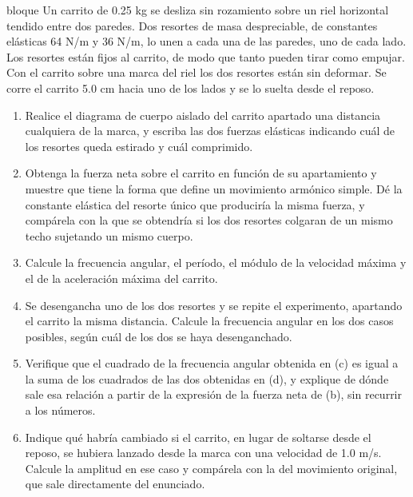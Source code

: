 \documentclass[11pt,openany]{book}
\begin{document}
\begin{ejercicio}{bloque}
Un carrito de 0.25 kg se desliza sin rozamiento sobre un riel horizontal tendido entre dos paredes. Dos resortes de masa despreciable, de constantes elásticas 64 N/m y 36 N/m, lo unen a cada una de las paredes, uno de cada lado. Los resortes están fijos al carrito, de modo que tanto pueden tirar como empujar. Con el carrito sobre una marca del riel los dos resortes están sin deformar. Se corre el carrito 5.0 cm hacia uno de los lados y se lo suelta desde el reposo.
\begin{enumerate}[label=(\alph*), leftmargin=1.7em, itemsep=1pt, topsep=3pt]
  \item Realice el diagrama de cuerpo aislado del carrito apartado una distancia cualquiera de la marca, y escriba las dos fuerzas elásticas indicando cuál de los resortes queda estirado y cuál comprimido.
  \item Obtenga la fuerza neta sobre el carrito en función de su apartamiento y muestre que tiene la forma que define un movimiento armónico simple. Dé la constante elástica del resorte único que produciría la misma fuerza, y compárela con la que se obtendría si los dos resortes colgaran de un mismo techo sujetando un mismo cuerpo.
  \item Calcule la frecuencia angular, el período, el módulo de la velocidad máxima y el de la aceleración máxima del carrito.
  \item Se desengancha uno de los dos resortes y se repite el experimento, apartando el carrito la misma distancia. Calcule la frecuencia angular en los dos casos posibles, según cuál de los dos se haya desenganchado.
  \item Verifique que el cuadrado de la frecuencia angular obtenida en (c) es igual a la suma de los cuadrados de las dos obtenidas en (d), y explique de dónde sale esa relación a partir de la expresión de la fuerza neta de (b), sin recurrir a los números.
  \item Indique qué habría cambiado si el carrito, en lugar de soltarse desde el reposo, se hubiera lanzado desde la marca con una velocidad de 1.0 m/s. Calcule la amplitud en ese caso y compárela con la del movimiento original, que sale directamente del enunciado.
\end{enumerate}
\end{ejercicio}
\end{document}
